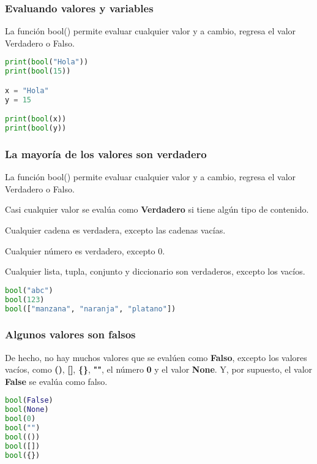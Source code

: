 \begin{frame}[fragile]
  \frametitle{Evaluando valores y variables}

  La función \textcolor{codeKeyword2}{bool}() permite evaluar cualquier
  valor y a cambio, regresa el valor Verdadero o Falso.

  \vspace{\baselineskip}
  \begin{lstlisting}[language=Python]
print(bool("Hola"))
print(bool(15))

x = "Hola"
y = 15

print(bool(x))
print(bool(y))
  \end{lstlisting}
\end{frame}

\begin{frame}[fragile]
  \frametitle{La mayoría de los valores son verdadero}

  \vspace{\baselineskip}
  La función \textcolor{codeKeyword2}{bool}() permite evaluar cualquier
  valor y a cambio, regresa el valor Verdadero o Falso.

  \pausa
  \vspace{\baselineskip}
  Casi cualquier valor se evalúa como \textbf{Verdadero} si tiene algún
  tipo de contenido.

  \pausa
  \vspace{\baselineskip}
  Cualquier cadena es verdadera, excepto las cadenas vacías.

  \pausa
  \vspace{\baselineskip}
  Cualquier número es verdadero, excepto 0.

  \pausa
  \vspace{\baselineskip}
  Cualquier lista, tupla, conjunto y diccionario son verdaderos, excepto
  los vacíos.
  \begin{lstlisting}[language=Python]
bool("abc")
bool(123)
bool(["manzana", "naranja", "platano"])
  \end{lstlisting}
\end{frame}

\begin{frame}[fragile]
  \frametitle{Algunos valores son falsos}

  De hecho, no hay muchos valores que se evalúen como \textbf{Falso},
  excepto los valores vacíos, como \textbf{()}, \textbf{[]}, \textbf{\{\}},
  \textbf{""}, el número \textbf{0} y el
  valor \textbf{None}. Y, por supuesto, el valor \textbf{False} se evalúa
  como falso.

  \vspace{\baselineskip}
  \begin{lstlisting}[language=Python]
bool(False)
bool(None)
bool(0)
bool("")
bool(())
bool([])
bool({}) 
  \end{lstlisting}
\end{frame}

